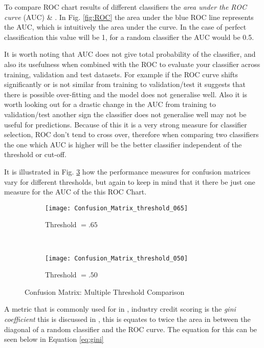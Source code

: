 To compare ROC chart results of different classifiers the \textit{area under the ROC curve} (AUC) \citep{bradley_use_1997} \& \citep{hanley_meaning_1982}. In Fig. \ref{fig:ROC} the area under the blue ROC line represents the AUC, which is intuitively the area under the curve. In the case of perfect classification this value will be 1, for a random classifier the AUC would be 0.5. 

It is worth noting that AUC does not give total probability of the classifier, and also its usefulness when combined with the ROC to evaluate your classifier across training, validation and test datasets. For example if the ROC curve shifts significantly or is not similar from training to validation/test it suggests that there is possible over-fitting and the model does not generalise well. Also it is worth looking out for a drastic change in the AUC from training to validation/test another sign the classifier does not generalise well may not be useful for predictions. Because of this it is a very strong measure for classifier selection, ROC don't tend to cross over, therefore when comparing two classifiers the one which AUC is higher will be the better classifier independent of the threshold or cut-off.

It is illustrated in Fig. \ref{fig:matric_compare} how the performance measures for confusion matrices vary for different thresholds, but again to keep in mind that it there be just one measure for the AUC of the this ROC Chart.   

\begin{figure}[H]
	\centering
	\begin{subfigure}[b]{0.45\textwidth}
		\captionsetup{font=scriptsize}
		\texttt{[image: Confusion\_Matrix\_threshold\_065]}
		\caption{Threshold $=.65$}\label{fig:Threshold65}
	\end{subfigure} ~\quad
	\begin{subfigure}[b]{0.45\textwidth}
		\captionsetup{font=scriptsize}
		\texttt{[image: Confusion\_Matrix\_threshold\_050]}
		\caption{Threshold $=.50$}\label{fig:Threshold50}
	\end{subfigure}
	\caption{Confusion Matrix: Multiple Threshold Comparison}
	\label{fig:matric_compare}
\end{figure}

A metric that is commonly used for in \subjectname, industry credit scoring is the \textit{gini coefficient} this is discussed in \citep{hand_good_2005}, this is equates to twice the area in between the diagonal of a random classifier and the ROC curve. The equation for this can be seen below in Equation \ref{eq:gini}

